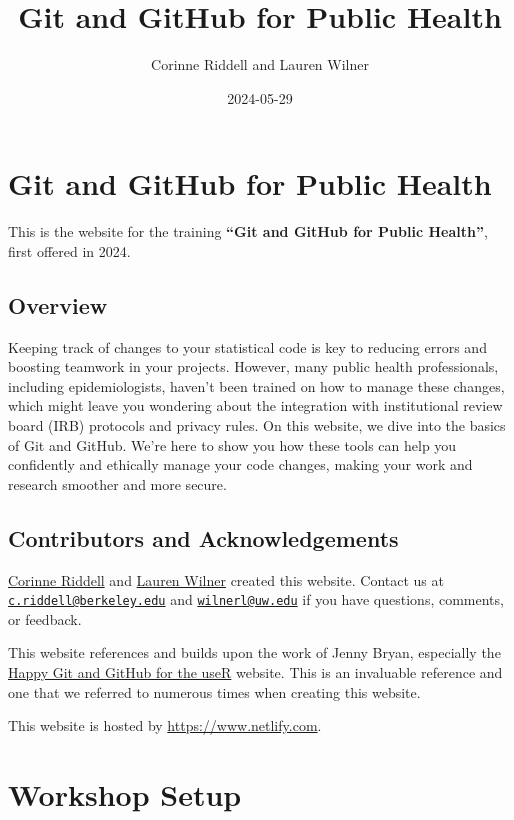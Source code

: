 \documentclass[
]{book}
\title{Git and GitHub for Public Health}
\author{Corinne Riddell and Lauren Wilner}
\date{2024-05-29}
\begin{document}
\maketitle

{
\setcounter{tocdepth}{1}
\tableofcontents
}
\chapter{Git and GitHub for Public Health}\label{git-and-github-for-public-health}

This is the website for the training \textbf{``Git and GitHub for Public Health''},
first offered in 2024.

\section{Overview}\label{overview}

Keeping track of changes to your statistical code is key to reducing errors and boosting teamwork in your projects. However, many public health professionals, including epidemiologists, haven't been trained on how to manage these changes, which might leave you wondering about the integration with institutional review board (IRB) protocols and privacy rules. On this website, we dive into the basics of Git and GitHub. We're here to show you how these tools can help you confidently and ethically manage your code changes, making your work and research smoother and more secure.

\section{Contributors and Acknowledgements}\label{contributors-and-acknowledgements}

\href{https://corinne-riddell.github.io/}{Corinne Riddell} and \href{laurenwilner.github.io}{Lauren Wilner}
created this website. Contact us at \href{mailto:c.riddell@berkeley.edu}{\nolinkurl{c.riddell@berkeley.edu}} and \href{mailto:wilnerl@uw.edu}{\nolinkurl{wilnerl@uw.edu}} if
you have questions, comments, or feedback.

This website references and builds upon the work of Jenny Bryan, especially the
\href{https://happygitwithr.com/}{Happy Git and GitHub for the useR} website. This is
an invaluable reference and one that we referred to numerous times when creating
this website.

This website is hosted by \url{https://www.netlify.com}.

\chapter{Workshop Setup}\label{workshop-setup}
\end{document}
